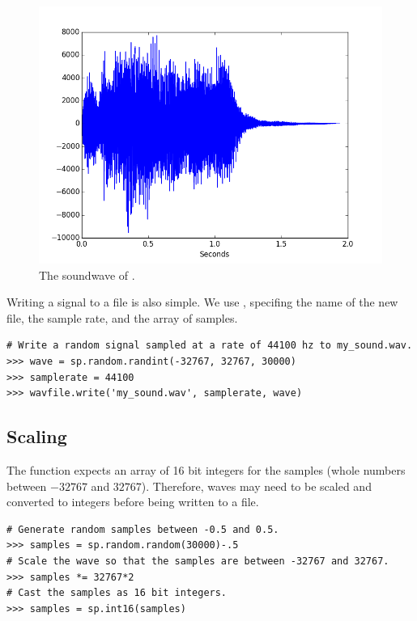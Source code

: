 \begin{figure}[ht]
\centering
\includegraphics[width=\textwidth]{tada.png}
\caption{The soundwave of .}
\label{fig:tada_sig}
\end{figure}

Writing a signal to a file is also simple.
We use , specifing the name of the new file, the sample rate, and the array of samples.

\begin{lstlisting}
# Write a random signal sampled at a rate of 44100 hz to my_sound.wav.
>>> wave = sp.random.randint(-32767, 32767, 30000)
>>> samplerate = 44100
>>> wavfile.write('my_sound.wav', samplerate, wave)
\end{lstlisting}

\subsection*{Scaling}

The  function expects an array of 16 bit integers for the samples (whole numbers between $-32767$ and $32767$).
Therefore, waves may need to be scaled and converted to integers before being written to a file.

\begin{lstlisting}
# Generate random samples between -0.5 and 0.5.
>>> samples = sp.random.random(30000)-.5
# Scale the wave so that the samples are between -32767 and 32767.
>>> samples *= 32767*2
# Cast the samples as 16 bit integers.
>>> samples = sp.int16(samples)
\end{lstlisting}

